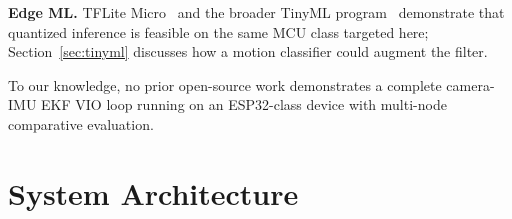 \documentclass[conference]{IEEEtran}
\begin{document}
\textbf{Edge ML.}
TFLite Micro~\cite{david2021tflitemicro} and the broader TinyML
program~\cite{warden2019tinyml,liu2020edgeai} demonstrate that
quantized inference is feasible on the same MCU class targeted here;
Section~\ref{sec:tinyml} discusses how a motion classifier could
augment the filter.

To our knowledge, no prior open-source work demonstrates a complete
camera-IMU EKF VIO loop running on an ESP32-class device with
multi-node comparative evaluation.

\section{System Architecture}
\label{sec:arch}
\end{document}
